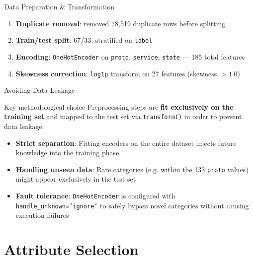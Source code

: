 \documentclass{beamer}
\begin{document}
\begin{frame}{Data Preparation \& Transformation}
  \begin{enumerate}
    \item \textbf{Duplicate removal}: removed 78,519 duplicate rows before
      splitting
    \item \textbf{Train/test split}: 67/33, stratified on \texttt{label}
    \item \textbf{Encoding}: \texttt{OneHotEncoder} on \texttt{proto},
      \texttt{service}, \texttt{state} — 185 total features
    \item \textbf{Skewness correction}: \texttt{log1p} transform on 27
      features (skewness $> 1.0$)
  \end{enumerate}
\end{frame}

\begin{frame}{Avoiding Data Leakage}
  \begin{alertblock}{Key methodological choice}
    Preprocessing steps are \textbf{fit exclusively on the training set} and mapped to the test set via \texttt{transform()} in order to prevent data leakage.
  \end{alertblock}
  \vspace{0.3cm}
  \begin{itemize}
    \item \textbf{Strict separation}: Fitting encoders on the entire dataset injects future knowledge into the training phase
    \item \textbf{Handling unseen data}: Rare categories (e.g. within the 133 \texttt{proto} values) might appear exclusively in the test set
    \item \textbf{Fault tolerance}: \texttt{OneHotEncoder} is configured 
      with \texttt{handle\_unknown='ignore'} to safely bypass novel 
      categories without causing execution failures
  \end{itemize}
\end{frame}

\section{Attribute Selection}
\end{document}
